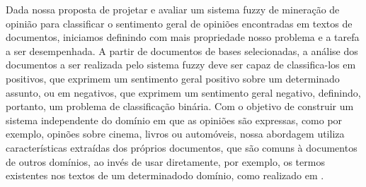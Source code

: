 \documentclass[template.tex]{subfiles}
\begin{document}


%
%

Dada nossa proposta de projetar e avaliar um sistema fuzzy de mineração de opinião para classificar o sentimento geral de opiniões encontradas em textos de documentos, iniciamos definindo com mais propriedade nosso problema e a tarefa a ser desempenhada. A partir de documentos de bases selecionadas, a análise dos documentos a ser realizada pelo sistema fuzzy deve ser capaz de classifica-los em positivos, que exprimem um sentimento geral positivo sobre um determinado assunto, ou em negativos, que exprimem um sentimento geral negativo, definindo, portanto, um problema de classificação binária. Com o objetivo de construir um sistema independente do domínio em que as opiniões são expressas, como por exemplo, opinões sobre cinema, livros ou automóveis, nossa abordagem utiliza características extraídas dos próprios documentos, que são comuns à documentos de outros domínios, ao invés de usar diretamente, por exemplo, os termos existentes nos textos de um determinadodo domínio, como realizado em .
\end{document}
